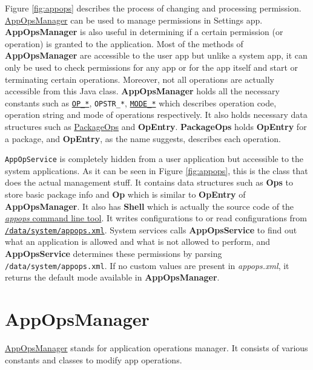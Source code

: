 Figure \cref{fig:appops} describes the process of changing and processing permission.
\hyperref[sec:appopsmanager]{AppOpsManager} can be used to manage permissions in Settings app. \textbf{AppOpsManager} is
also useful in determining if a certain permission (or operation) is granted to the application. Most of the methods of
\textbf{AppOpsManager} are accessible to the user app but unlike a system app, it can only be used to check permissions
for any app or for the app itself and start or terminating certain operations. Moreover, not all operations are actually
accessible from this Java class. \textbf{AppOpsManager} holds all the necessary constants such as
\hyperref[subsec:op-constants]{\texttt{OP\_*}}, \texttt{OPSTR\_*}, \hyperref[subsec:mode-constants]{\texttt{MODE\_*}}
which describes operation code, operation string and mode of operations respectively. It also holds necessary data
structures such as \hyperref[subsec:package-ops]{PackageOps} and \textbf{OpEntry}. \textbf{PackageOps} holds
\textbf{OpEntry} for a package, and \textbf{OpEntry}, as the name suggests, describes each operation.

\texttt{AppOpService} is completely hidden from a user application but accessible to the system applications.
As it can be seen in Figure \cref{fig:appops}, this is the class that does the actual management stuff.
It contains data structures such as \textbf{Ops} to store basic package info and \textbf{Op} which is similar to
\textbf{OpEntry} of \textbf{AppOpsManager}.
It also has \textbf{Shell} which is actually the source code of the \hyperref[sec:appops-cli]{\textit{appops} command line tool}.
It writes configurations to or read configurations from \hyperref[sec:appops-xml]{\texttt{/data/system/appops.xml}}.
System services calls \textbf{AppOpsService} to find out what an application is allowed and what is not allowed to perform,
and \textbf{AppOpsService} determines these permissions by parsing \texttt{/data/system/appops.xml}. If no custom values
are present in \textit{appops.xml}, it returns the default mode available in \textbf{AppOpsManager}.

\section{AppOpsManager}\label{sec:appopsmanager}
\href{https://android.googlesource.com/platform/frameworks/base/+/master/core/java/android/app/AppOpsManager.java}{AppOpsManager}
stands for application operations manager. It consists of various constants and classes to modify app operations.

